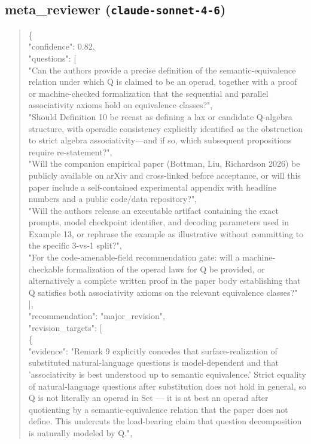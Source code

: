 \documentclass[11pt]{article}
\begin{document}
\subsection*{meta\_reviewer (\texttt{claude-sonnet-4-6})}
\begin{quote}\small\ttfamily\raggedright
\{\\
  "confidence": 0.82,\\
  "questions": [\\
    "Can the authors provide a precise definition of the semantic-equivalence relation under which Q is claimed to be an operad, together with a proof or machine-checked formalization that the sequential and parallel associativity axioms hold on equivalence classes?",\\
    "Should Definition 10 be recast as defining a lax or candidate Q-algebra structure, with operadic consistency explicitly identified as the obstruction to strict algebra associativity---and if so, which subsequent propositions require re-statement?",\\
    "Will the companion empirical paper (Bottman, Liu, Richardson 2026) be publicly available on arXiv and cross-linked before acceptance, or will this paper include a self-contained experimental appendix with headline numbers and a public code/data repository?",\\
    "Will the authors release an executable artifact containing the exact prompts, model checkpoint identifier, and decoding parameters used in Example 13, or rephrase the example as illustrative without committing to the specific 3-vs-1 split?",\\
    "For the code-amenable-field recommendation gate: will a machine-checkable formalization of the operad laws for Q be provided, or alternatively a complete written proof in the paper body establishing that Q satisfies both associativity axioms on the relevant equivalence classes?"\\
  ],\\
  "recommendation": "major\_revision",\\
  "revision\_targets": [\\
    \{\\
      "evidence": "Remark 9 explicitly concedes that surface-realization of substituted natural-language questions is model-dependent and that 'associativity is best understood up to semantic equivalence.' Strict equality of natural-language questions after substitution does not hold in general, so Q is not literally an operad in Set --- it is at best an operad after quotienting by a semantic-equivalence relation that the paper does not define. This undercuts the load-bearing claim that question decomposition is naturally modeled by Q.",\\

\end{quote}
\end{document}
